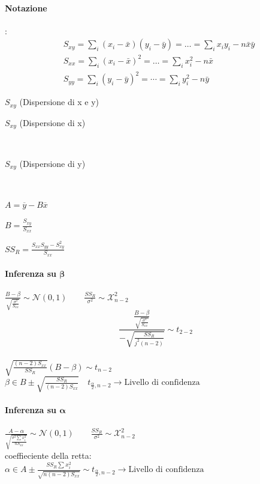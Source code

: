 \documentclass[]{article}
\begin{document}
    \paragraph{Notazione}:
    \begin{equation}
        \begin{aligned}
            & S_{x y}=\sum_i\left(x_i-\bar{x}\right)\left(y_i-\bar{y}\right)=\ldots=\sum_i x_i y_i-n \bar{x} \bar{y} \\
            & S_{x x}=\sum_i\left(x_i-\bar{x}\right)^2=\ldots=\sum_i x_i^2-n \bar{x} \\
            & S_{y y}=\sum_i\left(y_i-\bar{y}\right)^2=\cdots=\sum_i y_i^2-n \bar{y}
        \end{aligned}
    \end{equation}
    \begin{minipage}{0.5\textwidth}
        $S_{xy}$ (Dispersione di x e y)
    \end{minipage}
    \begin{minipage}{0.5\textwidth}
        $S_{xy}$ (Dispersione di x)
    \end{minipage} \\
    \centerline{$S_{xy}$ (Dispersione di y)} \\[3ex]
    \begin{minipage}{0.3\textwidth}
        $A = \overline{y} - B \overline{x}$
    \end{minipage}
    \begin{minipage}{0.3\textwidth}
        $B = \frac{S_{xy}}{S_{xx}}$
    \end{minipage}
    \begin{minipage}{0.3\textwidth}
        $SS_R = \frac{S_{xx} S_{yy} - S_{xy}^2}{S_{xx}}$
    \end{minipage}
    \paragraph{Inferenza su $\mathbf{\beta}$}
    $\frac{B - \beta}{\sqrt{\frac{\sigma^2}{S_{xx}}}} \sim \mathcal{N}(0,1) \qquad \frac{SS_R}{\sigma^2} \sim \mathcal{X}^2_{n-2}$
    \[ \frac{\frac{B - \beta}{\sqrt{\frac{\sigma^2}{S_{xx}}}}}{- \sqrt{\frac{SS_R}{j^2(n-2)}}} \sim t_{2-2} \] \\[4ex]
    $\displaystyle\sqrt{\frac{(n-2) S_{xx}}{SS_R}} (B- \beta) \sim t_{n-2}$ \\
    $\beta \in B \pm \sqrt{\frac{SS_R}{(n-2) S_{xx}}} \quad t_{\frac{\alpha}{2}, n-2} \rightarrow \text{Livello di confidenza}$
    \paragraph{Inferenza su $\mathbf{\alpha}$}
    $\displaystyle\frac{A - \alpha}{\sqrt{\frac{\sigma^2 \sum_{}^{} x^2_i}{nS_{xx}}}} \sim \mathcal{N}(0,1) \qquad \frac{SS_R}{\sigma^2} \sim \mathcal{X}^2_{n-2}$ \\
    coeffieciente della retta: \\[2ex]
    $\alpha \in A \pm \frac{SS_R \sum_{}^{} x^2_i}{\sqrt{n(n-2) S_{xx}}} \sim t_{\frac{\alpha}{2}, n-2} \rightarrow \text{Livello di confidenza}$
\end{document}
